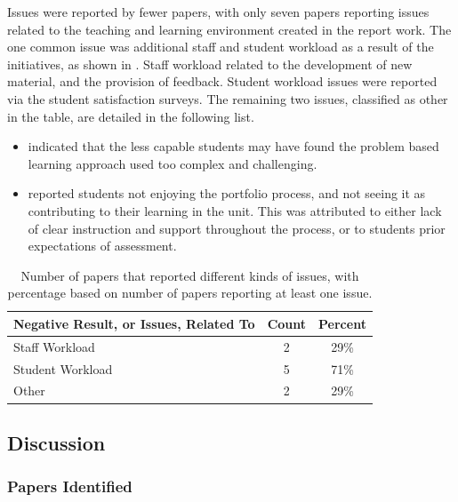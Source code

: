 Issues were reported by fewer papers, with only seven papers reporting issues related to the teaching and learning environment created in the report work. The one common issue was additional staff and student workload as a result of the initiatives, as shown in . Staff workload related to the development of new material, and the provision of feedback. Student workload issues were reported via the student satisfaction surveys. The remaining two issues, classified as other in the table, are detailed in the following list.

\begin{itemize}[noitemsep,nolistsep]
	\item \citet{Lin:2004} indicated that the less capable students may have found the problem based learning approach used too complex and challenging.
	\item \cite{Tang:1999} reported students not enjoying the portfolio process, and not seeing it as contributing to their learning in the unit. This was attributed to either lack of clear instruction and support throughout the process, or to students prior expectations of assessment.
\end{itemize}

\begin{table}[p]
	\centering
	\caption{Number of papers that reported different kinds of issues, with percentage based on number of papers reporting at least one issue.}
	\label{tbl:neg_results}
	\footnotesize
    \begin{tabular}{l|c|c}
     \textbf{Negative Result, or Issues, Related To} & \textbf{Count} & \textbf{Percent} \\ \hline
	Staff Workload	& 2	& 29\% \\
	Student Workload	& 5	& 71\% \\
	Other	& 2	& 29\% \\
    \end{tabular}
\end{table}



\clearpage
\subsection{Discussion} %
\label{sub:discussion}


\subsubsection{Papers Identified} %
\label{ssub:geographic_location}


